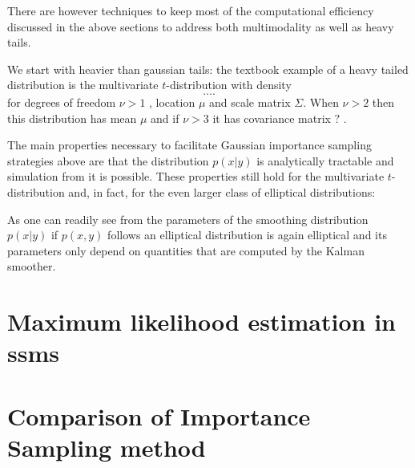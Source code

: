 There are however techniques to keep most of the computational efficiency discussed in the above sections to address both multimodality as well as heavy tails.

We start with heavier than gaussian tails: the textbook example of a heavy tailed distribution is the multivariate $t$-distribution with density
$$
    \dots .
$$
for degrees of freedom  $\nu > 1$ , location $\mu$ and scale matrix $\Sigma$. When $\nu > 2$ then this distribution has mean $\mu$ and if $\nu > 3$ it has covariance matrix $?$ .

The main properties necessary to facilitate Gaussian importance sampling strategies above are that the distribution $p(x|y)$ is analytically tractable and simulation from it is possible. These properties still hold for the multivariate $t$-distribution and, in fact, for the even larger class of elliptical distributions:

\begin{theorem}
    \label{thm:elliptical-conditional}
\end{theorem}

As one can readily see from  the parameters of the smoothing distribution $p(x|y)$ if $p(x,y)$ follows an elliptical distribution is again elliptical and its parameters only depend on quantities that are computed by the Kalman smoother. 



\section{Maximum likelihood estimation in \texorpdfstring{\glspl{ssm}}{state space models}}
\label{sec:maximum_likelihood_estimation}

\section{Comparison of Importance Sampling method}
\label{sec:simulation_studies}

